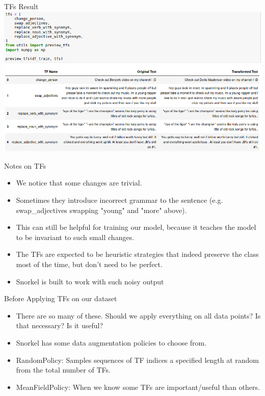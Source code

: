 \documentclass{beamer}
\begin{document}
\begin{frame}{TFs Result}
        \includegraphics[width=\textwidth]{figures/tfsresult.png}
\end{frame}

\begin{frame}{Notes on TFs}
\begin{itemize}
\item We notice that some changes are trivial.
\item Sometimes they introduce incorrect grammar to the sentence (e.g. swap\_adjectives swapping "young" and "more" above). \pause
\item This can still be helpful for training our model, because it teaches the model to be invariant to such small changes. \pause
\item The TFs are expected to be heuristic strategies that indeed preserve the class most of the time, but don't need to be perfect. 
\item Snorkel is built to work with such noisy output
\end{itemize}
\end{frame}

\begin{frame}{Before Applying TFs on our dataset}
    \begin{itemize}
        \item There are so many of these. Should we apply everything on all data points? Is that necessary? Is it useful? \pause
        \item Snorkel has some data augmentation policies to choose from.
        \item RandomPolicy: Samples sequences of TF indices a specified length at random from the total number of TFs.
        \item MeanFieldPolicy: When we know some TFs are important/useful than others. 
    \end{itemize}
\end{frame}
\end{document}
